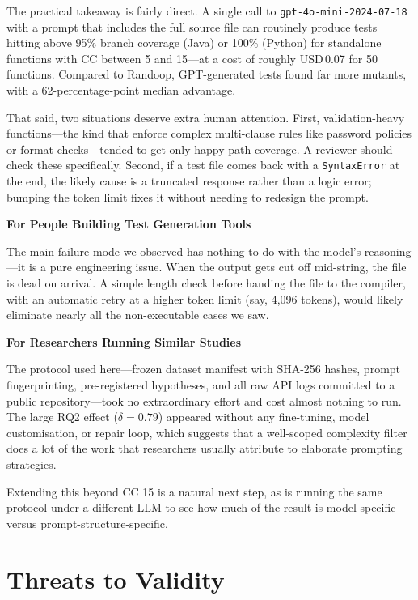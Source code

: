 \documentclass[conference]{IEEEtran}
\begin{document}
The practical takeaway is fairly direct. A single call to \texttt{gpt-4o-mini-2024-07-18} with a prompt that includes the full source file can routinely produce tests hitting above 95\% branch coverage (Java) or 100\% (Python) for standalone functions with CC between 5 and 15---at a cost of roughly USD\,0.07 for 50 functions. Compared to Randoop, GPT-generated tests found far more mutants, with a 62-percentage-point median advantage.

That said, two situations deserve extra human attention. First, validation-heavy functions---the kind that enforce complex multi-clause rules like password policies or format checks---tended to get only happy-path coverage. A reviewer should check these specifically. Second, if a test file comes back with a \texttt{SyntaxError} at the end, the likely cause is a truncated response rather than a logic error; bumping the token limit fixes it without needing to redesign the prompt.

\textbf{For People Building Test Generation Tools}

The main failure mode we observed has nothing to do with the model's reasoning---it is a pure engineering issue. When the output gets cut off mid-string, the file is dead on arrival. A simple length check before handing the file to the compiler, with an automatic retry at a higher token limit (say, 4,096 tokens), would likely eliminate nearly all the non-executable cases we saw.

\textbf{For Researchers Running Similar Studies}

The protocol used here---frozen dataset manifest with SHA-256 hashes, prompt fingerprinting, pre-registered hypotheses, and all raw API logs committed to a public repository---took no extraordinary effort and cost almost nothing to run. The large RQ2 effect ($\delta = 0.79$) appeared without any fine-tuning, model customisation, or repair loop, which suggests that a well-scoped complexity filter does a lot of the work that researchers usually attribute to elaborate prompting strategies.

Extending this beyond CC 15 is a natural next step, as is running the same protocol under a different LLM to see how much of the result is model-specific versus prompt-structure-specific.


\section{Threats to Validity}
\label{sec:threats}
\end{document}

